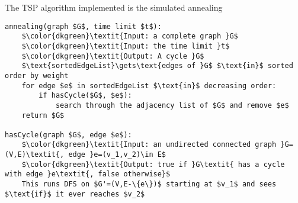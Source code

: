 \documentclass[11pt,letterpaper]{article}
\begin{document}
The TSP algorithm implemented is the simulated annealing 
\begin{lstlisting}
annealing(graph $G$, time limit $t$):
	$\color{dkgreen}\textit{Input: a complete graph }G$
	$\color{dkgreen}\textit{Input: the time limit }t$
	$\color{dkgreen}\textit{Output: A cycle }G$
	$\text{sortedEdgeList}\gets\text{edges of }G$ $\text{in}$ sorted order by weight
	for edge $e$ in sortedEdgeList $\text{in}$ decreasing order:
		if hasCycle($G$, $e$):
			search through the adjacency list of $G$ and remove $e$
	return $G$
	
hasCycle(graph $G$, edge $e$):
	$\color{dkgreen}\textit{Input: an undirected connected graph }G=(V,E)\textit{, edge }e=(v_1,v_2)\in E$
	$\color{dkgreen}\textit{Output: true if }G\textit{ has a cycle with edge }e\textit{, false otherwise}$
	This runs DFS on $G'=(V,E-\{e\})$ starting at $v_1$ and sees $\text{if}$ it ever reaches $v_2$
	
\end{lstlisting}
\end{document}
